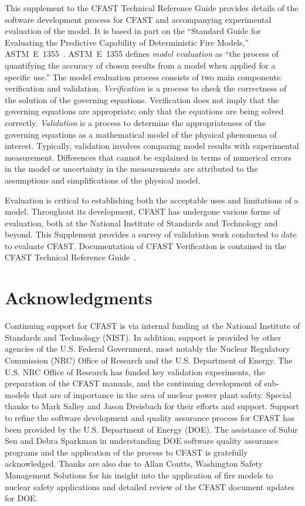 \documentclass[12pt]{book}
\begin{document}
This supplement to the CFAST Technical Reference Guide provides details of the software development process for CFAST and accompanying experimental evaluation of the model. It is based in part on the ``Standard Guide for Evaluating the Predictive Capability of Deterministic Fire Models,'' ASTM~E~1355~\cite{ASTM:E1355}. ASTM~E~1355 defines {\em model evaluation} as ``the process of quantifying the accuracy of chosen results from a model when applied for a specific use.'' The model evaluation process consists of two main components: verification and validation. {\em Verification} is a process to check the correctness of the solution of the governing equations. Verification does not imply that the governing equations are appropriate; only that the equations are being solved correctly. {\em Validation} is a process to determine the appropriateness of the governing equations as a mathematical model of the physical phenomena of interest. Typically, validation involves comparing model results with experimental measurement. Differences that cannot be explained in terms of numerical errors in the model or uncertainty in the measurements are attributed to the assumptions and simplifications of the physical model.

Evaluation is critical to establishing both the acceptable uses and limitations of a model. Throughout its development, CFAST has undergone various forms of evaluation, both at the National Institute of Standards and Technology and beyond. This Supplement provides a survey of validation work conducted to date to evaluate CFAST. Documentation of CFAST Verification is contained in the CFAST Technical Reference Guide~\cite{CFAST_Tech_Guide_6}.

\chapter{Acknowledgments}

\label{acksection}

Continuing support for CFAST is via internal funding at the National Institute of Standards and Technology (NIST). In addition, support is provided by other agencies of the U.S. Federal Government, most notably the Nuclear Regulatory Commission (NRC) Office of Research and the U.S. Department of Energy. The U.S. NRC Office of Research has funded key validation experiments, the preparation
of the CFAST manuals, and the continuing development of sub-models that are of importance in the area of nuclear power plant safety. Special thanks to Mark Salley and Jason Dreisbach for their efforts and support. Support to refine the software development and quality assurance process for CFAST has been provided by the U.S. Department of Energy (DOE). The assistance of Subir Sen and Debra Sparkman in understanding DOE software quality assurance programs and the application of the process to CFAST is gratefully acknowledged.  Thanks are also due to Allan Coutts, Washington Safety Management Solutions for his insight into the application of fire models to nuclear safety applications and detailed review of the CFAST document updates for DOE.
\end{document}
